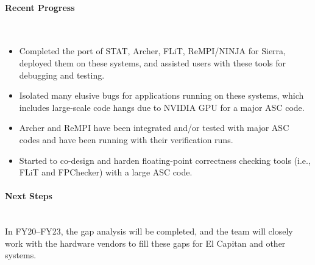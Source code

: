 \paragraph{Recent Progress} \leavevmode \\

\begin{itemize}

\item Completed the port of STAT, Archer, FLiT, ReMPI/NINJA for Sierra,
    deployed them on these systems, and assisted users with these tools for
    debugging and testing.

\item Isolated many elusive bugs for applications running on these systems,
    which includes large-scale code hangs due to NVIDIA GPU for a major ASC code.

\item Archer and ReMPI have been integrated and/or tested with major ASC codes
    and have been running with their verification runs.

\item Started to co-design and harden floating-point correctness checking tools
    (i.e., FLiT and FPChecker) with a large ASC code.

\end{itemize}

\paragraph{Next Steps}  \leavevmode \\

In FY20–FY23, the gap analysis will be completed, and the team will
closely work with the hardware vendors to fill these gaps for El Capitan
and other systems.
